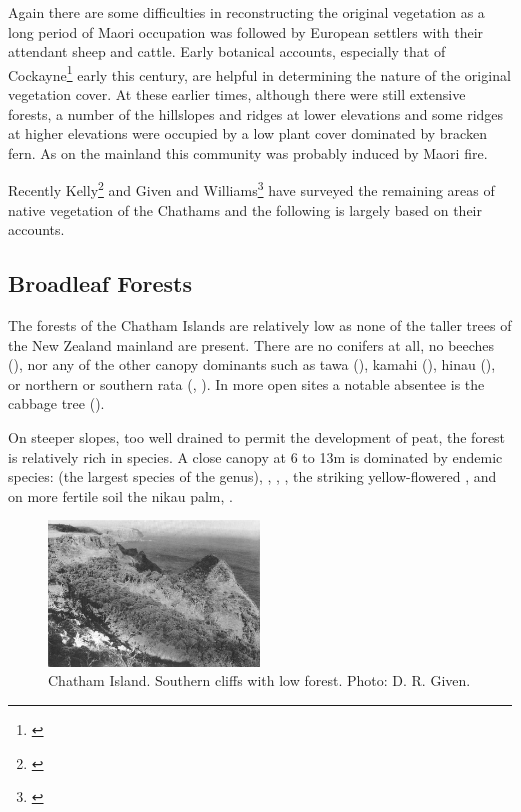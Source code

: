 Again there are some difficulties in reconstructing the original vegetation as a long period of Maori occupation was followed by European settlers with their attendant sheep and cattle.
Early botanical accounts, especially that of Cockayne\footnote{\cite{cockayne1902chatham}} early this century, are helpful in determining the nature of the original vegetation cover.
At these earlier times, although there were still extensive forests, a number of the hillslopes and ridges at lower elevations and some ridges at higher elevations were occupied by a low plant cover dominated by bracken fern.
As on the mainland this community was probably induced by Maori fire.

Recently Kelly\footnote{\cite{kelly1983distribution}} and Given and Williams\footnote{\cite{given1984conservation}} have surveyed the remaining areas of native vegetation of the Chathams and the following is largely based on their accounts.

\subsection{Broadleaf Forests}

The forests of the Chatham Islands are relatively low as none of the taller trees of the New Zealand mainland are present.
There are no conifers at all, no beeches (), nor any of the other canopy dominants such as tawa (), kamahi (), hinau (), or northern or southern rata (, ).
In more open sites a notable absentee is the cabbage tree ().

On steeper slopes, too well drained to permit the development of peat, the forest is relatively rich in species.
A close canopy at 6 to 13m is dominated by endemic species:  (the largest species of the genus), , , , the striking yellow-flowered , and on more fertile soil the nikau palm, .

\begin{figure}
	\includegraphics[width=0.5\textwidth]{graphics/figure118chatham-island.jpg}
	\centering
	\caption[Chatham Island, southern cliffs]{Chatham Island.
	Southern cliffs with low forest.
	Photo: D. R. Given.}%
	\label{fig:118chatham-island}
\end{figure}

